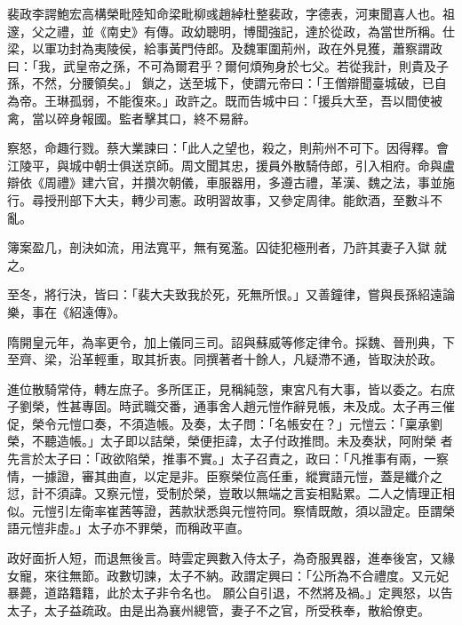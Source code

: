 
\begin{pinyinscope}

 裴政李諤鮑宏高構榮毗陸知命梁毗柳彧趙綽杜整裴政，字德表，河東聞喜人也。祖邃，父之禮，並《南史》有傳。政幼聰明，博聞強記，達於從政，為當世所稱。仕梁，以軍功封為夷陵侯，給事黃門侍郎。及魏軍圍荊州，政在外見獲，蕭察謂政曰：「我，武皇帝之孫，不可為爾君乎？爾何煩殉身於七父。若從我計，則貴及子孫，不然，分腰領矣。」
 鎖之，送至城下，使謂元帝曰：「王僧辯聞臺城破，已自為帝。王琳孤弱，不能復來。」政許之。既而告城中曰：「援兵大至，吾以間使被禽，當以碎身報國。監者擊其口，終不易辭。



 察怒，命趣行戮。蔡大業諫曰：「此人之望也，殺之，則荊州不可下。因得釋。會江陵平，與城中朝士俱送京師。周文聞其忠，援員外散騎侍郎，引入相府。命與盧辯依《周禮》建六官，并攢次朝儀，車服器用，多遵古禮，革漢、魏之法，事並施行。尋授刑部下大夫，轉少司憲。政明習故事，又參定周律。能飲酒，至數斗不亂。



 簿案盈几，剖決如流，用法寬平，無有冤濫。囚徒犯極刑者，乃許其妻子入獄
 就之。



 至冬，將行決，皆曰：「裴大夫致我於死，死無所恨。」又善鐘律，嘗與長孫紹遠論樂，事在《紹遠傳》。



 隋開皇元年，為率更令，加上儀同三司。詔與蘇威等修定律令。採魏、晉刑典，下至齊、梁，沿革輕重，取其折衷。同撰著者十餘人，凡疑滯不通，皆取決於政。



 進位散騎常侍，轉左庶子。多所匡正，見稱純愨，東宮凡有大事，皆以委之。右庶子劉榮，性甚專固。時武職交番，通事舍人趙元愷作辭見帳，未及成。太子再三催促，榮令元愷口奏，不須造帳。及奏，太子問：「名帳安在？」元愷云：「稟承劉榮，不聽造帳。」太子即以詰榮，榮便拒諱，太子付政推問。未及奏狀，阿附榮
 者先言於太子曰：「政欲陷榮，推事不實。」太子召責之，政曰：「凡推事有兩，一察情，一據證，審其曲直，以定是非。臣察榮位高任重，縱實語元愷，蓋是纖介之愆，計不須諱。又察元愷，受制於榮，豈敢以無端之言妄相點累。二人之情理正相似。元愷引左衛率崔茜等證，茜款狀悉與元愷符同。察情既敵，須以證定。臣謂榮語元愷非虛。」太子亦不罪榮，而稱政平直。



 政好面折人短，而退無後言。時雲定興數入侍太子，為奇服異器，進奉後宮，又緣女寵，來往無節。政數切諫，太子不納。政謂定興曰：「公所為不合禮度。又元妃暴薨，道路籍籍，此於太子非令名也。
 願公自引退，不然將及禍。」定興怒，以告太子，太子益疏政。由是出為襄州總管，妻子不之官，所受秩奉，散給僚吏。




\end{pinyinscope}
